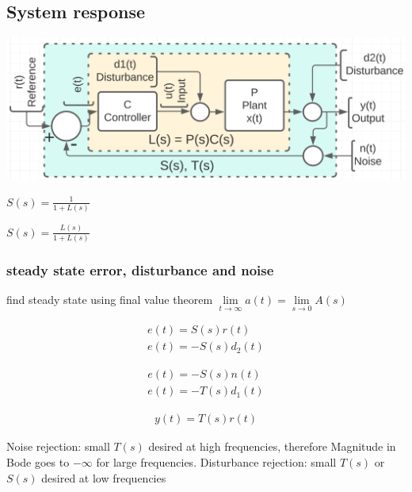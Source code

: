 \subsection{System response}
    \includegraphics[width = \linewidth]{src/images/basic_block_chart.png}
    \begin{minipage}{0.49\linewidth}
        \begin{center}
            $S(s) = \frac{1}{1 + L(s)}$
        \end{center}
    \end{minipage}
    \begin{minipage}{0.49\linewidth}
        \begin{center}
            $S(s) = \frac{L(s)}{1 + L(s)}$
        \end{center}
    \end{minipage}
    
    \subsubsection{steady state error, disturbance and noise}
    find steady state using final value theorem $\lim\limits_{t \rightarrow \infty} a(t) = \lim\limits_{s \rightarrow 0} A(s)$
    \begin{minipage}{0.32\linewidth}
        \begin{align*}
            e(t) = S(s) r(t)\\
            e(t) = - S(s) d_2(t)
        \end{align*}
    \end{minipage}
    \begin{minipage}{0.32\linewidth}
        \begin{align*}
            e(t) = - S(s) n(t)\\
            e(t) = - T(s) d_1(t)
        \end{align*}
    \end{minipage}
    \begin{minipage}{0.32\linewidth}
        \begin{align*}
            y(t) = T(s) r(t)
        \end{align*}
    \end{minipage}
    Noise rejection: small $T(s)$ desired at high frequencies, therefore Magnitude in Bode goes to $-\infty$ for large frequencies.
    Disturbance rejection: small $T(s)$ or $S(s)$ desired at low frequencies

